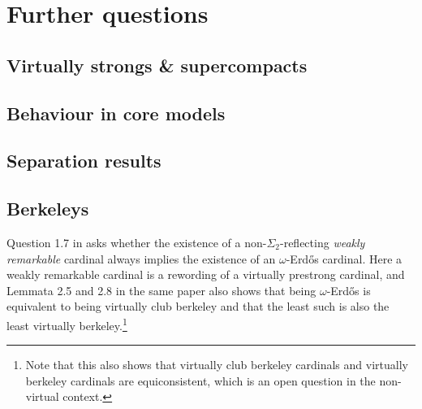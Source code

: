 \documentclass[../../main]{subfiles}
\begin{document}
\chapter{Further questions}
\thispagestyle{fancy}


\section{Virtually strongs \& supercompacts}




\section{Behaviour in core models}



\section{Separation results}




\section{Berkeleys}

Question 1.7 in \cite{RemarkableWilson} asks whether the existence of a non-$\Sigma_2$-reflecting \textit{weakly remarkable} cardinal always implies the existence of an $\omega$-Erd\H os cardinal. Here a weakly remarkable cardinal is a rewording of a virtually prestrong cardinal, and Lemmata 2.5 and 2.8 in the same paper also shows that being $\omega$-Erd\H os is equivalent to being virtually club berkeley and that the least such is also the least virtually berkeley.\footnote{Note that this also shows that virtually club berkeley cardinals and virtually berkeley cardinals are equiconsistent, which is an open question in the non-virtual context.}
\end{document}
